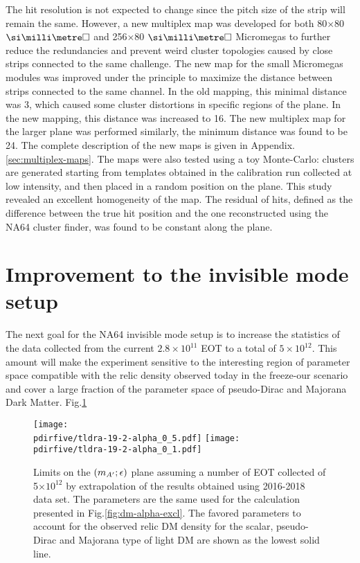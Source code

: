 The hit resolution is not expected to change since the pitch size of the strip will remain the same. However, a new multiplex map was developed for both 80$\times$80 $\mms$ and 256$\times$80 $\mms$ Micromegas to further reduce the redundancies and prevent weird cluster topologies caused by close strips connected to the same challenge. The new map for the small Micromegas modules was improved under the principle to maximize the distance between strips connected to the same channel. In the old mapping, this minimal distance was 3, which caused some cluster distortions in specific regions of the plane. In the new mapping, this distance was increased to 16. The new multiplex map for the larger plane was performed similarly, the minimum distance was found to be 24. The complete description of the new maps is given in Appendix.\ref{sec:multiplex-maps}. The maps were also tested using a toy Monte-Carlo: clusters are generated starting from templates obtained in the calibration run collected at low intensity, and then placed in a random position on the plane. This study revealed an excellent homogeneity of the map. The residual of hits, defined as the difference between the true hit position and the one reconstructed using the NA64 cluster finder, was found to be constant along the plane.



\section{Improvement to the invisible mode setup}
\label{ch5:sec:new-invismode-setup}

The next goal for the NA64 invisible mode setup is to increase the statistics of the data collected from the current $2.8 \times 10^{11}$ EOT to a total of $5 \times 10^{12}$. This amount will make the experiment sensitive to the interesting region of parameter space compatible with the relic density observed today in the freeze-our scenario and cover a large fraction of the parameter space of pseudo-Dirac and Majorana Dark Matter. Fig.\ref{fig:dm-sens-proj}

\begin{figure}[bht!]
  \centering
  \texttt{[image: \\pdirfive/tldra-19-2-alpha\_0\_5.pdf]}
  \texttt{[image: \\pdirfive/tldra-19-2-alpha\_0\_1.pdf]}
  \caption[sensitivity projection for invisible mode 2021]{Limits on the $(m_{A'};\epsilon)$ plane assuming a number of EOT collected of 5$\times 10^{12}$ by extrapolation of the results obtained using 2016-2018 data set. The parameters are the same used for the calculation presented in Fig.\ref{fig:dm-alpha-excl}. The favored parameters to account for the observed relic DM density for the scalar, pseudo-Dirac and Majorana type of light DM are shown as the lowest solid line.}
  \label{fig:dm-sens-proj}
\end{figure}

